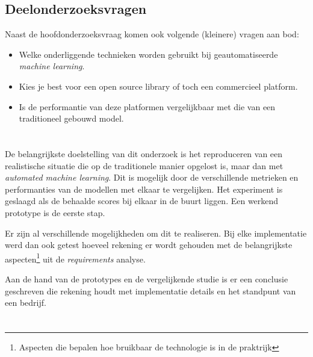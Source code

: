\subsection{Deelonderzoeksvragen}
\label{subsec:deelonderzoeksvragen}

Naast de hoofdonderzoeksvraag komen ook volgende (kleinere) vragen aan bod:

\begin{itemize}
    \item Welke onderliggende technieken worden gebruikt bij geautomatiseerde \textit{machine learning}.
    \item Kies je best voor een open source library of toch een commercieel platform.
    \item Is de performantie van deze platformen vergelijkbaar met die van een traditioneel gebouwd model.
\end{itemize}

\section{}
\label{sec:onderzoeksdoelstelling}

De belangrijkste doelstelling van dit onderzoek is het reproduceren van een realistische situatie die op de traditionele manier opgelost is, maar dan met \textit{automated machine learning}. Dit is mogelijk door de verschillende metrieken en performanties van de modellen met elkaar te vergelijken. Het experiment is geslaagd als de behaalde scores bij elkaar in de buurt liggen. Een werkend prototype is de eerste stap.

Er zijn al verschillende mogelijkheden om dit te realiseren. Bij elke implementatie werd dan ook getest hoeveel rekening er wordt gehouden met de belangrijkste aspecten\footnote{Aspecten die bepalen hoe bruikbaar de technologie is in de praktrijk} uit de \textit{requirements} analyse.

Aan de hand van de prototypes en de vergelijkende studie is er een conclusie geschreven die rekening houdt met implementatie details en het standpunt van een bedrijf.

\section{}
\label{sec:opzet-bachelorproef}


